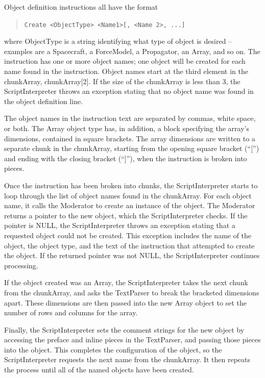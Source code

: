 Object definition instructions all have the format

\begin{quote}
   \texttt{Create <ObjectType> <Name1>[, <Name 2>, ...]}
\end{quote}

\noindent where ObjectType is a string identifying what type of object is desired -- examples are a
Spacecraft, a ForceModel, a Propagator, an Array, and so on.  The instruction has one or more
object names; one object will be created for each name found in the instruction.  Object names
start at the third element in the chunkArray, chunkArray[2].  If the size of the chunkArray is less
than 3, the ScriptInterpreter throws an exception stating that no object name was found in the
object definition line.

The object names in the instruction text are separated by commas, white space, or both.  The Array
object type has, in addition, a block specifying the array's dimensions, contained in square
brackets. The array dimensions are written to a separate chunk in the chunkArray, starting from the
opening square bracket (``['') and ending with the closing bracket (``]''), when the instruction is
broken into pieces.

Once the instruction has been broken into chunks, the ScriptInterpreter starts to loop through the
list of object names found in the chunkArray.  For each object name, it calls the Moderator to
create an instance of the object.  The Moderator returns a pointer to the new object, which the
ScriptInterpreter checks.  If the pointer is NULL, the ScriptInterpreter throws an exception
stating that a requested object could not be created.  This exception includes the name of the
object, the object type, and the text of the instruction that attempted to create the object.  If
the returned pointer was not NULL, the ScriptInterpreter continues processing.

If the object created was an Array, the ScriptInterpreter takes the next chunk from the chunkArray,
and asks the TextParser to break the bracketed dimensions apart.  These dimensions are then passed
into the new Array object to set the number of rows and columns for the array.

Finally, the ScriptInterpreter sets the comment strings for the new object by accessing the preface
and inline pieces in the TextParser, and passing those pieces into the object.  This completes the
configuration of the object, so the ScriptInterpreter requests the next name from the chunkArray.
It then repeats the process until all of the named objects have been created.

